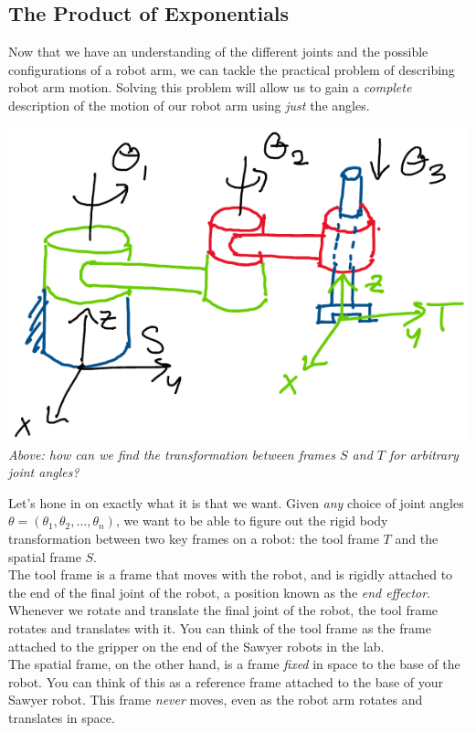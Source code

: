 \documentclass[oneside]{book}
\begin{document}
\subsection{The Product of Exponentials}
Now that we have an understanding of the different joints and the possible configurations of a robot arm, we can tackle the practical problem of describing robot arm motion. Solving this problem will allow us to gain a \textit{complete} description of the motion of our robot arm using \textit{just} the angles.
\begin{center}
    \includegraphics[scale=0.3]{images/forwardKin.png}\\
    \textit{Above: how can we find the transformation between frames $S$ and $T$ for arbitrary joint angles?}
\end{center}
Let's hone in on exactly what it is that we want. Given \textit{any} choice of joint angles $\theta = (\theta_1, \theta_2, ...,\theta_n)$, we want to be able to figure out the rigid body transformation between two key frames on a robot: the tool frame $T$ and the spatial frame $S$. \\
The tool frame is a frame that moves with the robot, and is rigidly attached to the end of the final joint of the robot, a position known as the \textit{end effector}. Whenever we rotate and translate the final joint of the robot, the tool frame rotates and translates with it. You can think of the tool frame as the frame attached to the gripper on the end of the Sawyer robots in the lab.\\
The spatial frame, on the other hand, is a frame \textit{fixed} in space to the base of the robot. You can think of this as a reference frame attached to the base of your Sawyer robot. This frame \textit{never} moves, even as the robot arm rotates and translates in space.\\
\end{document}
